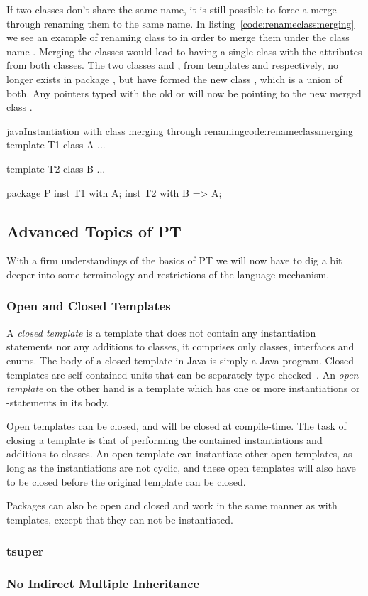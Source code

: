 If two classes don't share the same name, it is still possible to force a merge through renaming them to the same name.
In listing~\vref{code:renameclassmerging} we see an example of renaming class  to  in order to merge them under the class name .
Merging the classes would lead to having a single class  with the attributes from both classes.
The two classes  and , from templates  and  respectively, no longer exists in package , but have formed the new class , which is a union of both.
Any pointers typed with the old  or  will now be pointing to the new merged class .

\begin{code}{java}{Instantiation with class merging through renaming}{code:renameclassmerging}
template T1 {
    class A {
        ...
    }
}

template T2 {
    class B {
        ...
    }
}

package P {
    inst T1 with A;
    inst T2 with B => A;
}
\end{code}

\subsection{Advanced Topics of PT}\label{subsec:advanced-topics-of-pt}

With a firm understandings of the basics of PT we will now have to dig a bit deeper into some terminology and restrictions of the language mechanism.

\subsubsection{Open and Closed Templates}\label{subsubsec:open-and-closed-templates}

A \textit{closed template} is a template that does not contain any instantiation statements nor any additions to classes, it comprises only classes, interfaces and enums.
The body of a closed template in Java is simply a Java program.
Closed templates are self-contained units that can be separately type-checked~\cite{Axelsen2012}.
An \textit{open template} on the other hand is a template which has one or more instantiations or -statements in its body.

Open templates can be closed, and will be closed at compile-time.
The task of closing a template is that of performing the contained instantiations and additions to classes.
An open template can instantiate other open templates, as long as the instantiations are not cyclic, and these open templates will also have to be closed before the original template can be closed.

Packages can also be open and closed and work in the same manner as with templates, except that they can not be instantiated.

\subsubsection{tsuper}

\subsubsection{No Indirect Multiple Inheritance}
